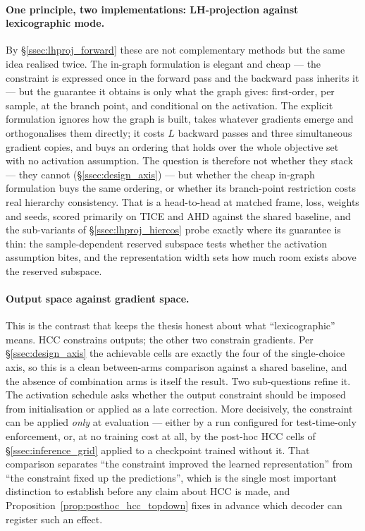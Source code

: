 \paragraph{One principle, two implementations: LH-projection against lexicographic
mode.} By \S\ref{ssec:lhproj_forward} these are not complementary methods but the
same idea realised twice. The in-graph formulation is elegant and cheap --- the
constraint is expressed once in the forward pass and the backward pass inherits it
--- but the guarantee it obtains is only what the graph gives: first-order, per
sample, at the branch point, and conditional on the activation. The explicit
formulation ignores how the graph is built, takes whatever gradients emerge and
orthogonalises them directly; it costs $L$ backward passes and three simultaneous
gradient copies, and buys an ordering that holds over the whole objective set with
no activation assumption. The question is therefore not whether they stack --- they
cannot (\S\ref{ssec:design_axis}) --- but whether the cheap in-graph formulation
buys the same ordering, or whether its branch-point restriction costs real
hierarchy consistency. That is a head-to-head at matched frame, loss, weights and
seeds, scored primarily on TICE and AHD against the shared baseline, and the
sub-variants of \S\ref{ssec:lhproj_hiercos} probe exactly where its guarantee is
thin: the sample-dependent reserved subspace tests whether the activation
assumption bites, and the representation width sets how much room exists above the
reserved subspace.

\paragraph{Output space against gradient space.} This is the contrast that keeps
the thesis honest about what ``lexicographic'' means. HCC constrains outputs; the
other two constrain gradients. Per \S\ref{ssec:design_axis} the achievable cells
are exactly the four of the single-choice axis, so this is a clean between-arms
comparison against a shared baseline, and the absence of combination arms is
itself the result. Two sub-questions refine it. The activation schedule asks
whether the output constraint should be imposed from initialisation or applied as
a late correction. More decisively, the constraint can be applied \emph{only} at
evaluation --- either by a run configured for test-time-only enforcement, or, at
no training cost at all, by the post-hoc HCC cells of \S\ref{ssec:inference_grid}
applied to a checkpoint trained without it. That comparison separates ``the
constraint improved the learned representation'' from ``the constraint fixed up
the predictions'', which is the single most important distinction to establish
before any claim about HCC is made, and Proposition~\ref{prop:posthoc_hcc_topdown}
fixes in advance which decoder can register such an effect.

